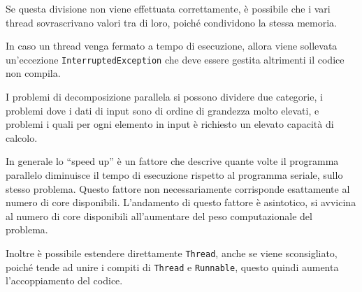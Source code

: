 \documentclass{article}
\numberwithin{equation}{subsection}
\begin{document}
Se questa divisione non viene effettuata correttamente, è possibile che i vari thread sovrascrivano valori tra di loro, poiché condividono la stessa memoria. 

In caso un thread venga fermato a tempo di esecuzione, allora viene sollevata un'eccezione \verb|InterruptedException| che deve essere gestita altrimenti il codice non 
compila. 

I problemi di decomposizione parallela si possono dividere due categorie, i problemi dove i dati di input sono di ordine di grandezza molto elevati, e problemi i quali 
per ogni elemento in input è richiesto un elevato capacità di calcolo. 

In generale lo ``speed up'' è un fattore che descrive quante volte il programma parallelo diminuisce il tempo di esecuzione rispetto al programma seriale, sullo stesso problema. 
Questo fattore non necessariamente corrisponde esattamente al numero di core disponibili. 
L'andamento di questo fattore è asintotico, si avvicina al numero di core disponibili all'aumentare del peso computazionale del problema. 

Inoltre è possibile estendere direttamente \verb|Thread|, anche se viene sconsigliato, poiché tende ad unire i compiti di \verb|Thread| e \verb|Runnable|, questo quindi 
aumenta l'accoppiamento del codice.  
\end{document}
